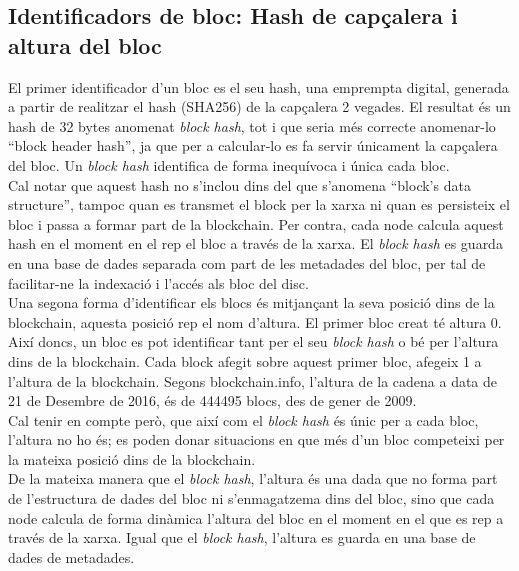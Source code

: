 \subsection{Identificadors de bloc: Hash de capçalera i altura del bloc}
El primer identificador d’un bloc es el seu hash, una emprempta digital, generada a partir de realitzar el hash (SHA256) de la capçalera 2 vegades. El resultat és un hash de 32 bytes anomenat \textit{block hash}, tot i que seria més correcte anomenar-lo “block header hash”, ja que per a calcular-lo es fa servir únicament la capçalera del bloc. Un \textit{block hash} identifica de forma inequívoca i única cada bloc.\\
\newline Cal notar que aquest hash no s’inclou dins del que s’anomena “block’s data structure”, tampoc quan es transmet el block per la xarxa ni quan es persisteix el bloc i passa a formar part de la blockchain. Per contra, cada node calcula aquest hash en el moment en el rep el bloc a través de la xarxa. El \textit{block hash} es guarda en una base de dades separada com part de les metadades del bloc, per tal de facilitar-ne la indexació i l’accés als bloc del disc.\\
\newline Una segona forma d’identificar els blocs és mitjançant la seva posició dins de la blockchain, aquesta posició rep el nom d’altura. El primer bloc creat té altura 0. 
Així doncs, un bloc es pot identificar tant per el seu \textit{block hash} o bé per l’altura dins de la blockchain. Cada block afegit sobre aquest primer bloc, afegeix 1 a l’altura de la blockchain. Segons blockchain.info, l’altura de la cadena a data de 21 de Desembre de 2016, és de 444495 blocs, des de gener de 2009.\\
\newline Cal tenir en compte però, que així com el \textit{block hash} és únic per a cada bloc, l’altura no ho és; es poden donar situacions en que més d’un bloc competeixi per la mateixa posició dins de la blockchain. \\
De la mateixa manera que el \textit{block hash}, l’altura és una dada que no forma part de l’estructura de dades del bloc ni s’enmagatzema dins del bloc, sino que cada node calcula de forma dinàmica l’altura del bloc en el moment en el que es rep a través de la xarxa. Igual que el \textit{block hash}, l’altura es guarda en una base de dades de metadades.

   

